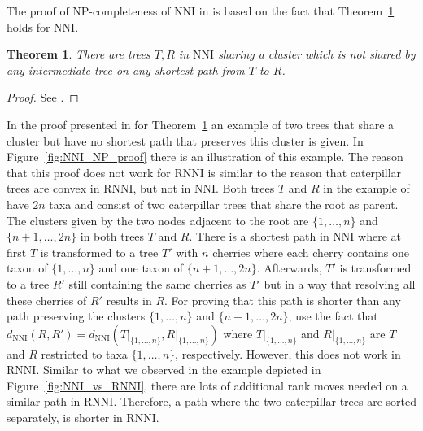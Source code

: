 \documentclass{amsart}
\newcommand{\nni}{\mathrm{NNI}}
\newcommand{\rnni}{\mathrm{RNNI}}
\newtheorem{theorem}[definition]{Theorem}
\begin{document}
The proof of NP-completeness of $\nni$ in \autocite{Dasgupta2000-xa} is based on the fact that Theorem~\ref{thm:split_nni} holds for $\nni$.

\begin{theorem}
	There are trees $T,R$ in $\nni$ sharing a cluster which is not shared by any intermediate tree on any shortest path from $T$ to $R$.
	\label{thm:split_nni}
\end{theorem}

\begin{proof}
	See \autocite{Li1996-zw}.
\end{proof}

In the proof presented in \autocite{Li1996-zw} for Theorem~\ref{thm:split_nni} an example of two trees that share a cluster but have no shortest path that preserves this cluster is given.
In Figure~\ref{fig:NNI_NP_proof} there is an illustration of this example.
The reason that this proof does not work for $\rnni$ is similar to the reason that caterpillar trees are convex in $\rnni$, but not in $\nni$.
Both trees $T$ and $R$ in the example of \autocite{Li1996-zw} have $2n$ taxa and consist of two caterpillar trees that share the root as parent.
The clusters given by the two nodes adjacent to the root are $\{1, \ldots, n\}$ and $\{n+1, \ldots, 2n\}$ in both trees $T$ and $R$.
There is a shortest path in $\nni$ where at first $T$ is transformed to a tree $T'$ with $n$ cherries where each cherry contains one taxon of $\{1, \ldots, n\}$ and one taxon of $\{n+1, \ldots, 2n\}$.
Afterwards, $T'$ is transformed to a tree $R'$ still containing the same cherries as $T'$ but in a way that resolving all these cherries of $R'$ results in $R$.
For proving that this path is shorter than any path preserving the clusters $\{1, \ldots, n\}$ and $\{n+1, \ldots, 2n\}$, \autocite{Li1996-zw} use the fact that $d_{\nni}(R,R') = d_{\nni}(T{\big|}_{\{1, \ldots, n\}}, R{\big|}_{\{1, \ldots, n\}})$ where $T{\big|}_{\{1, \ldots, n\}}$ and $R{\big|}_{\{1, \ldots, n\}}$ are $T$ and $R$ restricted to taxa $\{1,\ldots,n\}$, respectively.
However, this does not work in $\rnni$.
Similar to what we observed in the example depicted in Figure~\ref{fig:NNI_vs_RNNI}, there are lots of additional rank moves needed on a similar path in $\rnni$.
Therefore, a path where the two caterpillar trees are sorted separately, is shorter in $\rnni$.
\end{document}

